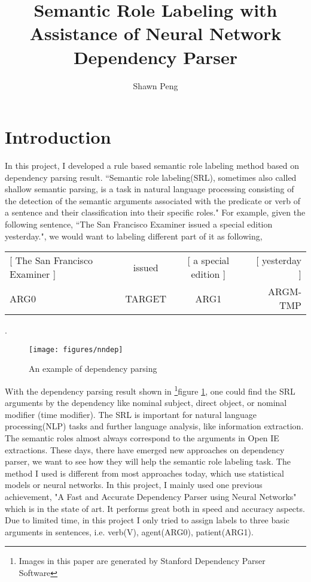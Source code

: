 \documentclass[letterpaper]{article}
\title{Semantic Role Labeling with Assistance of Neural Network Dependency Parser}
\author{Shawn Peng}
\begin{document}
\maketitle
{}
{}


\section{Introduction}
In this project, I developed a rule based semantic role labeling method based on dependency parsing result. ``Semantic role labeling(SRL), sometimes also called shallow semantic parsing, is a task in natural language processing consisting of the detection of the semantic arguments associated with the predicate or verb of a sentence and their classification into their specific roles." \cite{wiki:srl} For example, given the following sentence, ``The San Francisco Examiner issued a special edition yesterday.", we would want to labeling different part of it as following,\cite{Jurafsky:2009:SLP:1214993}\\

\bigskip
\begin{tabular}{ l c c r }
	[ The San Francisco Examiner ] & issued & [ a special edition ] & [ yesterday ] \\
	ARG0 & TARGET & ARG1 & ARGM-TMP \\
\end{tabular} .\\


\begin{figure}[h]
\centering
\texttt{[image: figures/nndep]}
\caption{An example of dependency parsing}
\label{fig:nndep}
\end{figure}

With the dependency parsing result shown in \footnote{Images in this paper are generated by Stanford Dependency Parser Software}figure \ref{fig:nndep}, one could find the SRL arguments by the dependency like nominal subject, direct object, or nominal modifier (time modifier). The SRL is important for natural language processing(NLP) tasks and further language analysis, like information extraction\cite{Punyakanok}. The semantic roles almost always correspond to the arguments in Open IE extractions\cite{Christensen:2010:SRL:1866775.1866782}. These days, there have emerged new approaches on dependency parser, we want to see how they will help the semantic role labeling task. The method I used is different from most approaches today, which use statistical models or neural networks. In this project, I mainly used one previous achievement, "A Fast and Accurate Dependency Parser using Neural Networks"\cite{manning-EtAl:2014:P14-5} which is in the state of art. It performs great both in speed and accuracy aspects. Due to limited time, in this project I only tried to assign labels to three basic arguments in sentences, i.e. verb(V), agent(ARG0), patient(ARG1).
\end{document}
